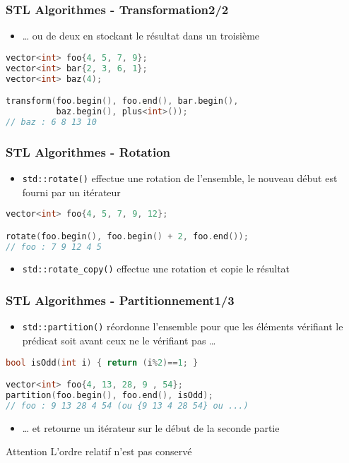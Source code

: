 \documentclass[C++.tex]{subfiles}
\begin{document}
\begin{frame}[fragile]
	\frametitle{STL Algorithmes - Transformation\titlehfill{}2/2}
	\begin{itemize}
		\item \ldots{} ou de deux en stockant le résultat dans un troisième
	\end{itemize}

	\begin{lstlisting}[language=C++]
vector<int> foo{4, 5, 7, 9};
vector<int> bar{2, 3, 6, 1};
vector<int> baz(4);

transform(foo.begin(), foo.end(), bar.begin(), 
          baz.begin(), plus<int>());
// baz : 6 8 13 10\end{lstlisting}
\end{frame}

\begin{frame}[fragile]
	\frametitle{STL Algorithmes - Rotation}
	\begin{itemize}
		\item \lstinline|std::rotate()| effectue une rotation de l'ensemble, le nouveau début est fourni par un itérateur
	\end{itemize}

	\begin{lstlisting}[language=C++]
vector<int> foo{4, 5, 7, 9, 12};

rotate(foo.begin(), foo.begin() + 2, foo.end());
// foo : 7 9 12 4 5\end{lstlisting}

	\begin{itemize}
		\item \lstinline|std::rotate_copy()| effectue une rotation et copie le résultat
	\end{itemize}
\end{frame}

\begin{frame}[fragile]
	\frametitle{STL Algorithmes - Partitionnement\titlehfill{}1/3}
	\begin{itemize}
		\item \lstinline|std::partition()| réordonne l'ensemble pour que les éléments vérifiant le prédicat soit avant ceux ne le vérifiant pas \ldots
	\end{itemize}

	\begin{lstlisting}[language=C++]
bool isOdd(int i) { return (i%2)==1; }

vector<int> foo{4, 13, 28, 9 , 54};
partition(foo.begin(), foo.end(), isOdd);
// foo : 9 13 28 4 54 (ou {9 13 4 28 54} ou ...)\end{lstlisting}


	\begin{itemize}
		\item \ldots{} et retourne un itérateur sur le début de la seconde partie
	\end{itemize}

	\begin{alertblock}{Attention}
		L'ordre relatif n'est pas conservé
	\end{alertblock}
\end{frame}
\end{document}
